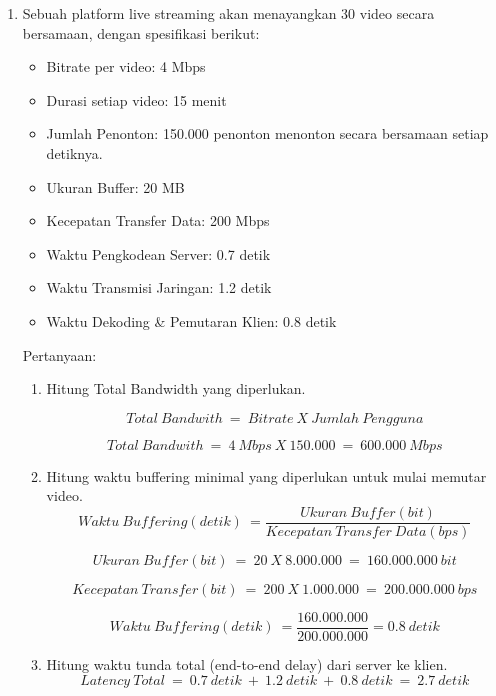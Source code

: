 \documentclass[12pt,a4paper]{article}
\begin{document}
\begin{enumerate}
\begin{enumerate}
    \end{enumerate}

  \item Sebuah platform live streaming akan menayangkan 30 video secara bersamaan, dengan
    spesifikasi berikut:

    \begin{itemize}
      \item Bitrate per video: 4 Mbps
      \item Durasi setiap video: 15 menit
      \item Jumlah Penonton: 150.000 penonton menonton secara bersamaan setiap detiknya.
      \item Ukuran Buffer: 20 MB
      \item Kecepatan Transfer Data: 200 Mbps
      \item Waktu Pengkodean Server: 0.7 detik
      \item Waktu Transmisi Jaringan: 1.2 detik
      \item Waktu Dekoding & Pemutaran Klien: 0.8 detik
    \end{itemize}

    Pertanyaan:
    \begin{enumerate}
      \item Hitung Total Bandwidth yang diperlukan.

        \[
          Total\ Bandwith\ =\ Bitrate\ X\ Jumlah\ Pengguna 
        \]

        \[
          Total\ Bandwith\ =\  4\ Mbps\ X\ 150.000\ =\ 600.000\ Mbps 
        \]

      \item Hitung waktu buffering minimal yang diperlukan untuk mulai memutar video.
        \[
          Waktu\ Buffering(detik)\ = \frac{Ukuran\ Buffer(bit)}{Kecepatan\ Transfer\ Data(bps)}
        \]

        \[
          Ukuran\ Buffer(bit)\ =\ 20\ X\ 8.000.000\ =\ 160.000.000\ bit
        \]

        \[
          Kecepatan\ Transfer(bit)\ =\ 200\ X\ 1.000.000\ =\ 200.000.000\ bps
        \]

        \[
          Waktu\ Buffering(detik)\ = \frac{160.000.000}{200.000.000} = 0.8\ detik
        \]

      \item Hitung waktu tunda total (end-to-end delay) dari server ke klien.
        \[
          Latency\ Total\ =\ 0.7\ detik\ +\ 1.2\ detik\ +\ 0.8\ detik\ =\ 2.7\ detik
        \]


\end{enumerate}
\end{enumerate}
\end{document}
